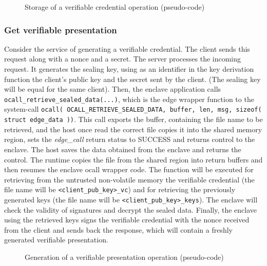 \begin{figure}[!h]
    \centering
    
    \caption{Storage of a verifiable credential operation (pseudo-code)}
    \label{poc-store-vc}
\end{figure}
\subsubsection{Get verifiable presentation}
Consider the service of generating a verifiable credential. The client sends this request along with a nonce and a secret. The server processes the incoming request. It generates the sealing key, using as an identifier in the key derivation function the client's public key and the secret sent by the client. (The sealing key will be equal for the same client). Then, the enclave application calls \texttt{ocall\_retrieve\_sealed\_data(...)}, which is the edge wrapper function to the system-call \texttt{ocall( OCALL\_RETRIEVE\_SEALED\_DATA, buffer, len, msg, sizeof( struct edge\_data ))}. This call exports the buffer, containing the file name to be retrieved, and the host once read the correct file copies it into the shared memory region, sets the \textit{edge\_call} return status to SUCCESS and returns control to the enclave. The host saves the data obtained from the enclave and returns the control. The runtime copies the file from the shared region into return buffers and then resumes the enclave ocall wrapper code.
The function will be executed for retrieving from the untrusted non-volatile memory the verifiable credential (the file name will be \texttt{<client\_pub\_key>\_vc}) and for retrieving the previously generated keys (the file name will be \texttt{<client\_pub\_key>\_keys}).
The enclave will check the validity of signatures and decrypt the sealed data.  
Finally, the enclave using the retrieved keys signs the verifiable credential with the nonce received from the client and sends back the response, which will contain a freshly generated verifiable presentation. \\

\begin{figure}[!h]
    \centering
    
    \caption{Generation of a verifiable presentation operation (pseudo-code)}
    \label{poc-get-vp}
\end{figure}

